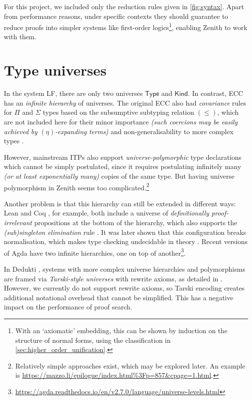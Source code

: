 \documentclass[twoside]{report}
\begin{document}
For this project, we included only the reduction rules given in \cref{fig:syntax}. Apart from performance reasons, under specific contexts they should guarantee to reduce proofs into simpler systems like first-order logics\footnote{With an `axiomatic' embedding, this can be shown by induction on the structure of normal forms, using the classification in \cref{sec:higher_order_unification}.}, enabling Zenith to work with them.

\section{Type universes}
\label{sec:universes}

In the system LF, there are only two universes $\mathsf{Type}$ and $\mathsf{Kind}$. In contrast, ECC has an \emph{infinite hierarchy} of universes. The original ECC also had \emph{covariance} rules for $\Pi$ and $\Sigma$ types based on the subsumptive subtyping relation $(\leq)$, which are not included here for their minor importance \emph{(such coercions may be easily achieved by $(\eta)$-expanding terms)} and non-generalisability to more complex types \cite{luo2012notes}.

However, mainstream ITPs also support \emph{universe-polymorphic} type declarations which cannot be simply postulated, since it requires postulating infinitely many \emph{(or at least exponentially many)} copies of the same type. But having universe polymorphism in Zenith seems too complicated.\footnote{Relatively simple approaches exist, which may be explored later. An example is \url{https://mazzo.li/epilogue/index.html\%3Fp=857&cpage=1.html}.}

Another problem is that this hierarchy can still be extended in different ways: Lean \cite{moura2021lean} and Coq \cite{gilbert2019definitional}, for example, both include a universe of \emph{definitionally proof-irrelevant} propositions at the bottom of the hierarchy, which also supports the \emph{(sub)singleton elimination} rule \cite{gilbert2019definitional}. It was later shown that this configuration breaks normalisation, which makes type checking undecidable in theory \cite{carneiro2019type,abel2020failure}. Recent versions of Agda have two infinite hierarchies, one on top of another\footnote{\url{https://agda.readthedocs.io/en/v2.7.0/language/universe-levels.html}}.

In Dedukti \cite{assaf2023dedukti}, systems with more complex universe hierarchies and polymorphisms are framed via \emph{Tarski-style universes} \cite{martin1984intuitionistic} with rewrite axioms, as detailed in \cite{cousineau2007embedding}. However, we currently do not support rewrite axioms, so Tarski encoding creates additional notational overhead that cannot be simplified. This has a negative impact on the performance of proof search.
\end{document}
